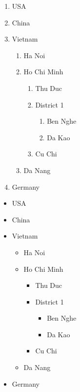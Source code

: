 \documentclass[12pt]{article}
\begin{document}
\begin{enumerate}
    \item USA
    \item China
    \item Vietnam
    \begin{enumerate}
        \item Ha Noi
        \item Ho Chi Minh
        \begin{enumerate}
            \item Thu Duc
            \item District 1
            \begin{enumerate}
                \item Ben Nghe
                \item Da Kao
            \end{enumerate}
            \item Cu Chi
        \end{enumerate}
        \item Da Nang
    \end{enumerate}
    \item Germany
\end{enumerate}

\vspace{4mm}

\begin{itemize}
    \item USA
    \item China
    \item Vietnam
    \begin{itemize}
        \item Ha Noi
        \item Ho Chi Minh
        \begin{itemize}
            \item Thu Duc
            \item District 1
            \begin{itemize}
                \item Ben Nghe
                \item Da Kao
            \end{itemize}
            \item Cu Chi
        \end{itemize}
        \item Da Nang
    \end{itemize}
    \item Germany
\end{itemize}
\end{document}
